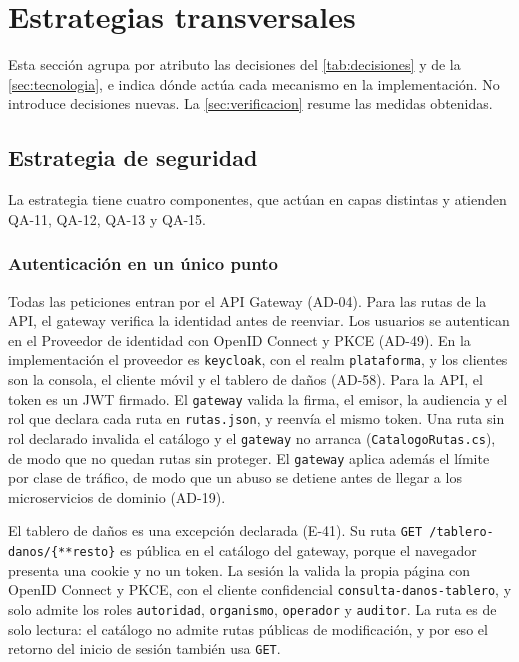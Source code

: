 \documentclass[11pt,letterpaper]{article}
\providecommand{\br}{\discretionary{}{}{}}
\begin{document}


\section{Estrategias transversales}
\label{sec:estrategias}

Esta sección agrupa por atributo las decisiones del \cref{tab:decisiones} y de la
\cref{sec:tecnologia}, e indica dónde actúa cada mecanismo en la implementación. No introduce
decisiones nuevas. La \cref{sec:verificacion} resume las medidas obtenidas.

\subsection{Estrategia de seguridad}
\label{sec:est-seguridad}

La estrategia tiene cuatro componentes, que actúan en capas distintas y atienden QA-11, QA-12, QA-13
y QA-15.

\subsubsection*{Autenticación en un único punto}

Todas las peticiones entran por el API Gateway (AD-04). Para las rutas de la API, el gateway
verifica la identidad antes de reenviar. Los usuarios se autentican en el Proveedor de
identidad con OpenID Connect y PKCE (AD-49). En la implementación el proveedor es
\texttt{keycloak}, con el realm \texttt{plataforma}, y los clientes son la consola, el cliente
móvil y el tablero de daños (AD-58). Para la API, el token es un JWT firmado. El \texttt{gateway} valida la firma, el emisor, la
audiencia y el rol que declara cada ruta en \texttt{rutas.json}, y reenvía el mismo token. Una ruta
sin rol declarado invalida el catálogo y el \texttt{gateway} no arranca
(\texttt{CatalogoRutas.\br{}cs}), de modo que no quedan rutas sin proteger. El \texttt{gateway}
aplica además el límite por clase de tráfico, de modo que un abuso se detiene antes de llegar a los
microservicios de dominio (AD-19).

El tablero de daños es una excepción declarada (E-41). Su ruta \texttt{GET /\br{}tablero-\br{}danos/\br{}\{**resto\}}
es pública en el catálogo del gateway, porque el navegador presenta una cookie y no un token. La sesión
la valida la propia página con OpenID Connect y PKCE, con el cliente confidencial
\texttt{consulta-\br{}danos-\br{}tablero}, y solo admite los roles \texttt{autoridad}, \texttt{organismo},
\texttt{operador} y \texttt{auditor}. La ruta es de solo lectura: el catálogo no admite rutas públicas
de modificación, y por eso el retorno del inicio de sesión también usa \texttt{GET}.
\end{document}

